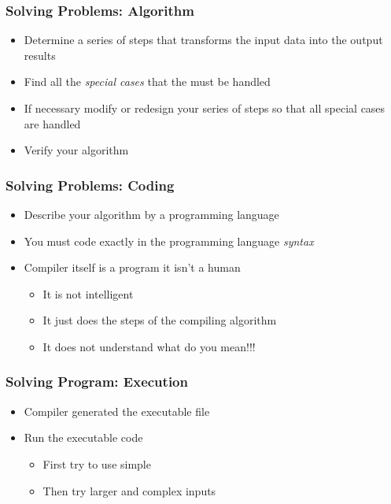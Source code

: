 \documentclass{../c-lecture}
\begin{document}
\begin{frame}
  \frametitle{Solving Problems: Algorithm}
  \begin{itemize}
    \item
      Determine a series of steps that transforms the input data into the output
      results
    \item
      Find all the \textit{\color{RubineRed} special cases} that the must be
      handled
    \item
      If necessary modify or redesign your series of steps so that all special
      cases are handled
    \item Verify your algorithm
  \end{itemize}
\end{frame}

\begin{frame}
  \frametitle{Solving Problems: Coding}
  \begin{itemize}
    \item Describe your algorithm by a programming language
    \item
      You must code exactly in the programming language
      \textit{\color{Orange} syntax}
    \item Compiler itself is a program it isn’t a human
    \begin{itemize}
      \item It is not intelligent
      \item It just does the steps of the compiling algorithm
      \item It does not understand what do you mean!!!
    \end{itemize}
  \end{itemize}
\end{frame}

\begin{frame}
  \frametitle{Solving Program: Execution}
  \begin{itemize}
    \item Compiler generated the executable file
    \item Run the executable code
    \begin{itemize}
      \item First try to use simple
      \item Then try larger and complex inputs
    \end{itemize}
  \end{itemize}
\end{frame}
\end{document}
